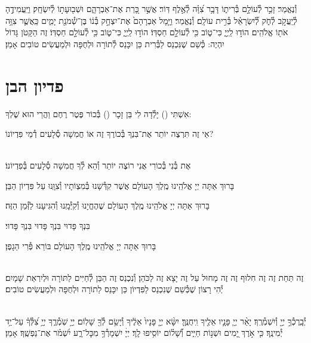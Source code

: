 \documentclass[twoside, openany, parskip=half, 11pt]{book}
\begin{document}

וְ֯נֶאֱמַר׃ זָכַ֣ר לְ֯עוֹלָ֣ם בְּ֯רִית֑וֹ דָּבָ֥ר צִ֝וָּ֗ה לְ֯אֶ֣לֶף דּֽוֹר׃ אֲשֶׁ֣ר כָּ֭רַת אֶת־אַבְרָהָ֑ם
וּשְׁב֖וּעָת֣וֹ לְ֯יִשְׂחָֽק׃ וַיַּֽעֲמִידֶ֣הָ לְ֯יַֽעֲקֹ֣ב לְ֯חֹ֑ק לְ֝֯יִשְׂרָאֵ֗ל בְּ֯רִ֣ית עוֹלָֽם׃
וְ֯נֶאֱמַר׃ וַיָּ֤מָל אַבְרָהָם֙ אֶת־יִצְחָ֣ק בְּ֯נ֔וֹ בֶּן־שְׁ֯מֹנַ֖ת יָמִ֑ים כַּֽאֲשֶׁ֛ר צִוָּ֥ה אֹת֖וֹ אֱלֹהִֽים׃ הוֹד֣וּ לַֽיְיָ֑ כִּי־ט֑וֹב כִּ֖י לְ֯עוֹלָ֣ם חַסְדּֽוֹ׃
הוֹד֣וּ לַֽיְיָ֑ כִּי־ט֑וֹב כִּ֖י לְ֯עוֹלָ֣ם חַסְדּֽוֹ׃
 זֶה הַקָּטֹן גָּדוֹל יִהְיֶה:
כְּ֯שֵׁם שֶׁנִּכְנַס לַבְּ֯רִית כֵּן יִכָּנֵס לְ֯תוֹרָה וּלְחֻפָּה וּלְמַעֲשִׂים טוֹבִים אָמֵן׃

\vfill
\sepline

\chapter[פדיון הבן]{ פדיון הבן }


אִשְׁתִּי () יָלְ֯דָה לִי בֵּן זָכָר () בְּ֯כוֹר פֶּטֶר רֶחֶם וַהֲרֵי הוּא שֶׁלְךָ:

אֵי זֶה תִּרְצֶה יוֹתֵר אֶת־בִּנְךָ בְּ֯כוֹרֶךָ זֶה אוֹ חֲמִשָׁה סְ֯לָעִים דְ֯מֵי פִּדְיוֹנוֹ?

\\
אֶת בְּ֯נִי בְּ֯כוֹרִי אֲנִי רוֹצֶה יוֹתֵר וְ֯הֵא לְ֯ךָ חֲמִשָׁה סְ֯לָעִים בְּ֯פִדְיוֹנוֹ׃

בָּרוּךְ אַתָּה יְיָ אֱלֹהֵֽינוּ מֶֽלֶךְ הָעוֹלָם אֲשֶׁר קִדְּ֯שָׁנוּ בְּ֯מִצְוֹתָיו וְ֯צִוָּֽנוּ עַל פִּדְיוֹן הַבֵּן׃

בָּרוּךְ אַתָּה יְיָ אֱלֹהֵֽינוּ מֶֽלֶךְ הָעוֹלָם שֶׁהֶחֱיָנוּ וְ֯קִיְּ֯מָֽנוּ וְ֯הִגִּיעָנוּ לַזְּ֯מַן הַזֶּה׃


בִּנְךָ פָּדוּי בִּנְךָ פָּדוּי בִּנְךָ פָּדוּי׃

בָּרוּךְ אַתָּה יְיָ אֱלֹהֵֽינוּ מֶֽלֶךְ הָעוֹלָם בּוֹרֵא פְּ֯רִי הַגָפֶן׃

 \\
זֶה תַּחַת זֶה זֶה חִלוּף זֶה זֶה מָחוּל עַל זֶה יָצָא זֶה לַכֹּהֵן׃
וְ֯נִכְנַס זֶה הַבֵּן לְ֯חַיִּים לַתּוֹרָה וּלְיִרְאַת שָׁמָיִם׃
יְ֯הִי רָצוֹן שֶׁכְּ֯שֵׁם שֶׁנִכְנַס לַפִּדְיוֹן כֵּן יִכָּנֵס לַתוֹרָה וּלְחֻפָּה וּלְמַעֲשִׂים טוֹבִים׃

\\
יְ֯בָֽרֶכְ֯ךָ֣ יְיָ֖ וְ֯יִשְׁמְ֯רֶֽךָ׃ יָאֵ֨ר יְיָ֧ פָּנָ֛יו אֵלֶ֖יךָ וִֽיחֻנֶּֽךָּ׃ יִשָּׂ֨א יְיָ֤ פָּנָיו֙ אֵלֶ֔יךָ וְ֯יָשֵׂ֥ם לְ֯ךָ֖ שָׁלֽוֹם׃
יְיָ֥ שֹֽׁמְ֯רֶ֑ךָ יְיָ֥ צִ֝לְּ֯ךָ֗ עַל־יַ֥ד יְ֯מִינֶֽךָ׃
כִּ֤י אֹ֣רֶךְ יָ֭מִים וּשְׁנ֣וֹת חַיִּ֑ים וְ֝֯שָׁל֗וֹם יוֹסִ֥יפוּ לָֽךְ׃
יְיָׄ יִשְׁמָרְ֯ךָ֥ מִכׇּל־רָ֑ע יִ֝שְׁמֹ֗ר אֶת־נַפְשֶֽׁךָ׃ אָמֵן׃
\end{document}
